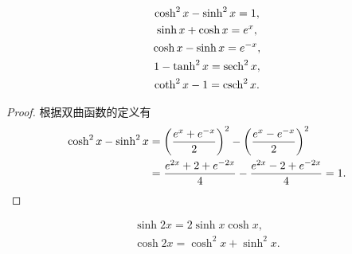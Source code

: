 \begin{theorem}
\begin{gather}
	\cosh^2x - \sinh^2x = 1, \\
	\sinh x + \cosh x = e^x, \\
	\cosh x - \sinh x = e^{-x}, \\
	1 - \tanh^2 x = \sech^2 x, \\
	\coth^2 x - 1 = \csch^2 x.
\end{gather}
\begin{proof}
根据双曲函数的定义有
\begin{align*}
	\cosh^2x-\sinh^2x
	&=\left(\frac{e^x + e^{-x}}{2}\right)^2-\left(\frac{e^x - e^{-x}}{2}\right)^2 \\
	&=\frac{e^{2x}+2+e^{-2x}}{4}-\frac{e^{2x}-2+e^{-2x}}{4}
	=1.
	\qedhere
\end{align*}
\end{proof}
\end{theorem}

\begin{theorem}
\begin{gather}
	\sinh2x = 2 \sinh x\cosh x, \\
	\cosh2x = \cosh^2x + \sinh^2x.
\end{gather}
\end{theorem}
